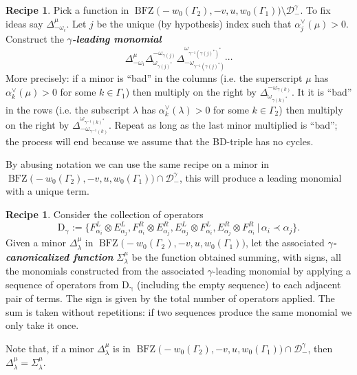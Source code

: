 \documentclass[a4paper]{amsart}
\theoremstyle{definition}
\newtheorem{recipe}[theorem]{Recipe}
\newcommand{\newword}[1]{\textbf{\emph{#1}}}
\begin{document}
\begin{recipe}
  Pick a function in $\operatorname{BFZ}\big(-w_0(\Gamma_2),-v,u,w_0(\Gamma_1)\big)\setminus \mathcal{D}^\gamma_-$. 
  To fix ideas say $\Delta_{-\omega_i}^\mu$.
  Let $j$ be the unique (by hypothesis) index such that $\alpha_j^\vee(\mu)>0$.
  Construct the \newword{$\gamma$-leading monomial}
  \[
    \Delta_{-\omega_i}^\mu 
    \Delta_{\omega_{\gamma(j)^*}}^{-\omega_{\gamma(j)}}
    \Delta_{-\omega_{\gamma^{-1}(\gamma(j)^*)}}^{\omega_{\gamma^{-1}(\gamma(j)^*)^*}}
    \cdots
  \]
  More precisely: if a minor is ``bad'' in the columns (i.e. the superscript $\mu$ has  $\alpha_k^\vee(\mu)>0$ for some $k\in\Gamma_1$) then multiply on the right by $\Delta_{\omega_{\gamma(k)^*}}^{-\omega_{\gamma(k)}}$.
  It it is ``bad'' in the rows (i.e. the subscript $\lambda$ has  $\alpha_k^\vee(\lambda)>0$ for some $k\in\Gamma_2$) then multiply on the right by $\Delta_{-\omega_{\gamma^{-1}(k)}}^{\omega_{\gamma^{-1}(k)^*}}$.
  Repeat as long as the last minor multiplied is ``bad''; the process will end because we assume that the BD-triple has no cycles.
\end{recipe}

By abusing notation we can use the same recipe on a minor in $\operatorname{BFZ}\big(-w_0(\Gamma_2),-v,u,w_0(\Gamma_1)\big)\cap \mathcal{D}^\gamma_-$, this will produce a leading monomial with a unique term.

\begin{recipe}
  Consider the collection of operators 
  \[
    \operatorname{D_\gamma}:=\Big\{ 
      F_{\alpha_i}^L\otimes E_{\alpha_j}^L, 
      F_{\alpha_i}^R\otimes E_{\alpha_j}^R, 
      E_{\alpha_j}^L\otimes F_{\alpha_i}^L, 
      E_{\alpha_j}^R\otimes F_{\alpha_i}^R
      \,\big|\,\alpha_i\prec\alpha_j
    \Big\}.
  \]
  Given a minor $\Delta_\lambda^\mu$ in $\operatorname{BFZ}\big(-w_0(\Gamma_2),-v,u,w_0(\Gamma_1)\big)$, let the associated \newword{$\gamma$-canonicalized function} $\Sigma_\lambda^\mu$  be the function obtained summing, with signs, all the monomials constructed from the associated $\gamma$-leading monomial by applying a sequence of operators from $\operatorname{D_\gamma}$ (including the empty sequence) to each adjacent pair of terms.
  The sign is given by the total number of operators applied.
  The sum is taken without repetitions: if two sequences produce the same monomial we only take it once.
\end{recipe}

Note that, if a minor $\Delta_\lambda^\mu$ is in $\operatorname{BFZ}\big(-w_0(\Gamma_2),-v,u,w_0(\Gamma_1)\big)\cap \mathcal{D}^\gamma_-$, then $\Delta_\lambda^\mu=\Sigma_\lambda^\mu$.
\end{document}
